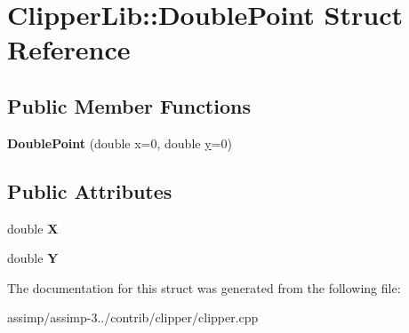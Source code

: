 \hypertarget{struct_clipper_lib_1_1_double_point}{\section{Clipper\+Lib\+:\+:Double\+Point Struct Reference}
\label{struct_clipper_lib_1_1_double_point}
}
\subsection*{Public Member Functions}
\begin{DoxyCompactItemize}
\item 
\hypertarget{struct_clipper_lib_1_1_double_point_a3ccbea6aaf488e0a2d8ac499d2676093}{{\bfseries Double\+Point} (double x=0, double \hyperlink{_ice_utils_8h_aa7ffaed69623192258fb8679569ff9ba}{y}=0)}\label{struct_clipper_lib_1_1_double_point_a3ccbea6aaf488e0a2d8ac499d2676093}

\end{DoxyCompactItemize}
\subsection*{Public Attributes}
\begin{DoxyCompactItemize}
\item 
\hypertarget{struct_clipper_lib_1_1_double_point_a675837cc05f20447313789b82d84ad31}{double {\bfseries X}}\label{struct_clipper_lib_1_1_double_point_a675837cc05f20447313789b82d84ad31}

\item 
\hypertarget{struct_clipper_lib_1_1_double_point_a49774a93540882d88448badf37034454}{double {\bfseries Y}}\label{struct_clipper_lib_1_1_double_point_a49774a93540882d88448badf37034454}

\end{DoxyCompactItemize}


The documentation for this struct was generated from the following file\+:\begin{DoxyCompactItemize}
\item 
assimp/assimp-\/3../contrib/clipper/clipper.\+cpp\end{DoxyCompactItemize}
